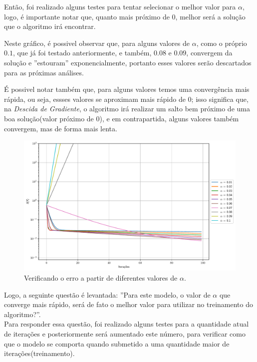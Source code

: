 \documentclass[a4paper, 12pt]{article}
\begin{document}
Então, foi realizado alguns testes para tentar selecionar o melhor valor para $\alpha$, logo, é importante
notar que, quanto mais próximo de $0$, melhor será a solução que o algoritmo irá encontrar. 

Neste gráfico, é possivel observar que, para alguns valores de $\alpha$, como o próprio $0.1$, que já foi testado anteriormente, e também,
$0.08$ e $0.09$, convergem da solução e ''estouram'' exponencialmente, portanto esses valores serão descartados para as próximas análises.

É possivel notar também que, para alguns valores temos uma convergência mais rápida, ou seja, essses valores se aproximam mais rápido de $0$; isso significa que, na \textit{Descida de Gradiente}, o algoritmo irá realizar
um salto bem próximo de uma boa solução(valor próximo de $0$), e em contrapartida, alguns valores também convergem, mas de forma mais lenta.


\begin{figure}[!h]
    \centering
    \includegraphics[width=1\textwidth]{../imgs/overflow_insights.pdf}
    \caption{Verificando o erro a partir de diferentes valores de $\alpha$.}
    \label{fig:overflow_insights}
\end{figure}

Logo, a seguinte questão é levantada: ''Para este modelo, o valor de $\alpha$ que converge mais rápido,
será de fato o melhor valor para utilizar no treinamento do algoritmo?''.\\

Para responder essa questão, foi realizado alguns testes para a quantidade atual de iterações e posteriormente será aumentado este
número, para verificar como que o modelo se comporta quando submetido a uma quantidade maior de iterações(treinamento).
\clearpage
\end{document}
